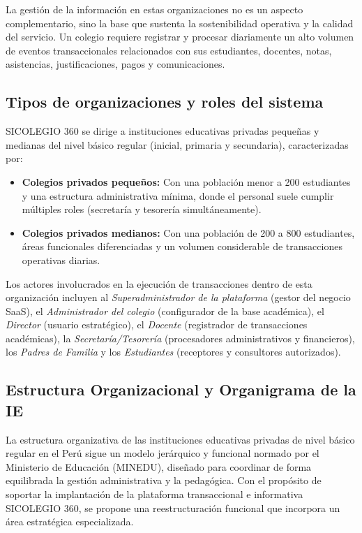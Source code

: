 \documentclass[12pt,a4paper,oneside]{report}
\begin{document}
La gestión de la información en estas organizaciones no es un aspecto complementario, sino la base que sustenta la sostenibilidad operativa y la calidad del servicio. Un colegio requiere registrar y procesar diariamente un alto volumen de eventos transaccionales relacionados con sus estudiantes, docentes, notas, asistencias, justificaciones, pagos y comunicaciones.

\subsection{Tipos de organizaciones y roles del sistema}
SICOLEGIO 360 se dirige a instituciones educativas privadas pequeñas y medianas del nivel básico regular (inicial, primaria y secundaria), caracterizadas por:
\begin{itemize}
    \item \textbf{Colegios privados pequeños:} Con una población menor a 200 estudiantes y una estructura administrativa mínima, donde el personal suele cumplir múltiples roles (secretaría y tesorería simultáneamente).
    \item \textbf{Colegios privados medianos:} Con una población de 200 a 800 estudiantes, áreas funcionales diferenciadas y un volumen considerable de transacciones operativas diarias.
\end{itemize}
Los actores involucrados en la ejecución de transacciones dentro de esta organización incluyen al \textit{Superadministrador de la plataforma} (gestor del negocio SaaS), el \textit{Administrador del colegio} (configurador de la base académica), el \textit{Director} (usuario estratégico), el \textit{Docente} (registrador de transacciones académicas), la \textit{Secretaría/Tesorería} (procesadores administrativos y financieros), los \textit{Padres de Familia} y los \textit{Estudiantes} (receptores y consultores autorizados).

\subsection{Estructura Organizacional y Organigrama de la IE}

La estructura organizativa de las instituciones educativas privadas de nivel básico regular en el Perú sigue un modelo jerárquico y funcional normado por el Ministerio de Educación (MINEDU), diseñado para coordinar de forma equilibrada la gestión administrativa y la pedagógica. Con el propósito de soportar la implantación de la plataforma transaccional e informativa SICOLEGIO 360, se propone una reestructuración funcional que incorpora un área estratégica especializada.
\end{document}
